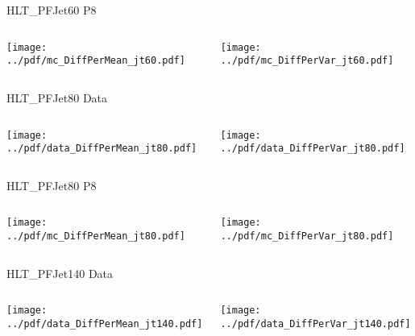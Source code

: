 \documentclass[9pt]{beamer}
\begin{document}
\begin{frame}[t]{HLT\_PFJet60 P8}
\begin{columns}[T]
  \begin{column}{.5\textwidth}
  \texttt{[image: ../pdf/mc\_DiffPerMean\_jt60.pdf]}
  \end{column}
  \begin{column}{.5\textwidth}
  \texttt{[image: ../pdf/mc\_DiffPerVar\_jt60.pdf]}
  \end{column}
\end{columns}
\end{frame}

\begin{frame}[t]{HLT\_PFJet80 Data}
\begin{columns}[T]
  \begin{column}{.5\textwidth}
  \texttt{[image: ../pdf/data\_DiffPerMean\_jt80.pdf]}
  \end{column}
  \begin{column}{.5\textwidth}
  \texttt{[image: ../pdf/data\_DiffPerVar\_jt80.pdf]}
  \end{column}
\end{columns}
\end{frame}

\begin{frame}[t]{HLT\_PFJet80 P8}
\begin{columns}[T]
  \begin{column}{.5\textwidth}
  \texttt{[image: ../pdf/mc\_DiffPerMean\_jt80.pdf]}
  \end{column}
  \begin{column}{.5\textwidth}
  \texttt{[image: ../pdf/mc\_DiffPerVar\_jt80.pdf]}
  \end{column}
\end{columns}
\end{frame}

\begin{frame}[t]{HLT\_PFJet140 Data}
\begin{columns}[T]
  \begin{column}{.5\textwidth}
  \texttt{[image: ../pdf/data\_DiffPerMean\_jt140.pdf]}
  \end{column}
  \begin{column}{.5\textwidth}
  \texttt{[image: ../pdf/data\_DiffPerVar\_jt140.pdf]}
  \end{column}
\end{columns}
\end{frame}
\end{document}
